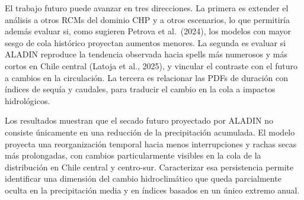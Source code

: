El trabajo futuro puede avanzar en tres direcciones. La primera es extender el análisis a otros RCMs del dominio CHP y a otros escenarios, lo que permitiría además evaluar si, como sugieren Petrova et al.~(2024), los modelos con mayor sesgo de cola histórico proyectan aumentos menores. La segunda es evaluar si ALADIN reproduce la tendencia observada hacia spells más numerosos y más cortos en Chile central (Latoja et al., 2025), y vincular el contraste con el futuro a cambios en la circulación. La tercera es relacionar las PDFs de duración con índices de sequía y caudales, para traducir el cambio en la cola a impactos hidrológicos.

Los resultados muestran que el secado futuro proyectado por ALADIN no consiste únicamente en una reducción de la precipitación acumulada. El modelo proyecta una reorganización temporal hacia menos interrupciones y rachas secas más prolongadas, con cambios particularmente visibles en la cola de la distribución en Chile central y centro-sur. Caracterizar esa persistencia permite identificar una dimensión del cambio hidroclimático que queda parcialmente oculta en la precipitación media y en índices basados en un único extremo anual.

